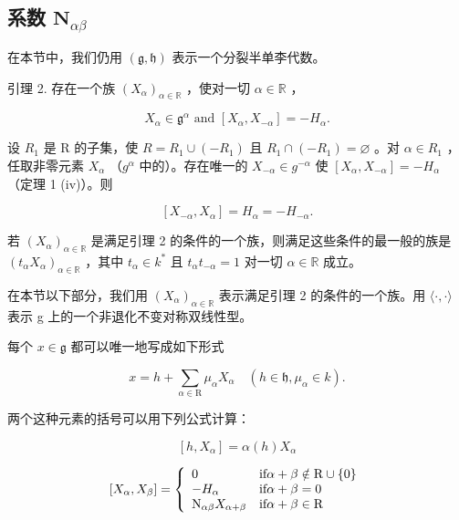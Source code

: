 \subsection{\texorpdfstring{系数 \(\mathbf{N}_{\alpha \beta}\)}{系数 \textbackslash mathbf\{N\}\_\{\textbackslash alpha \textbackslash beta\}}}

在本节中，我们仍用 \((\mathfrak{g},\mathfrak{h})\) 表示一个分裂半单李代数。

引理 2. 存在一个族 \((X_{\alpha})_{\alpha \in \mathbb{R}}\) ，使对一切 \(\alpha \in \mathbb{R}\) ，

\[
X _ {\alpha} \in \mathfrak {g} ^ {\alpha} \text { and } [ X _ {\alpha}, X _ {- \alpha} ] = - H _ {\alpha}.
\]

设 \(R_{1}\) 是 R 的子集，使 \(R = R_{1} \cup (-R_{1})\) 且 \(R_{1} \cap (-R_{1}) = \varnothing\) 。对 \(\alpha \in R_{1}\) ，任取非零元素 \(X_{\alpha}\) （\(g^{\alpha}\) 中的）。存在唯一的 \(X_{-\alpha} \in g^{-\alpha}\) 使 \([X_{\alpha}, X_{-\alpha}] = -H_{\alpha}\) （定理 1 (iv)）。则

\[
\left[ X _ {- \alpha}, X _ {\alpha} \right] = H _ {\alpha} = - H _ {- \alpha}.\tag{Q.E.D.}
\]

若 \((X_{\alpha})_{\alpha \in \mathbb{R}}\) 是满足引理 2 的条件的一个族，则满足这些条件的最一般的族是 \((t_{\alpha}X_{\alpha})_{\alpha \in \mathbb{R}}\) ，其中 \(t_{\alpha}\in k^{*}\) 且 \(t_{\alpha}t_{-\alpha} = 1\) 对一切 \(\alpha \in \mathbb{R}\) 成立。

在本节以下部分，我们用 \((X_{\alpha})_{\alpha\in\mathbb{R}}\) 表示满足引理 2 的条件的一个族。用 \(\langle\cdot,\cdot\rangle\) 表示 g 上的一个非退化不变对称双线性型。

每个 \(x \in \mathfrak{g}\) 都可以唯一地写成如下形式

\[
x = h + \sum_ {\alpha \in \mathrm{R}} \mu_ {\alpha} X _ {\alpha} \quad (h \in \mathfrak {h}, \mu_ {\alpha} \in k).
\]

两个这种元素的括号可以用下列公式计算：

\[
[ h, X _ {\alpha} ] = \alpha (h) X _ {\alpha}
\]

\[
[ X _ {\alpha}, X _ {\beta} ] = \left\{ \begin{array}{l l} 0 & \text {if} \alpha + \beta \notin \mathrm{R} \cup \{0 \} \\ - H _ {\alpha} & \text {if} \alpha + \beta = 0 \\ \mathrm{N} _ {\alpha \beta} X _ {\alpha + \beta} & \text {if} \alpha + \beta \in \mathrm{R} \end{array} \right.
\]

